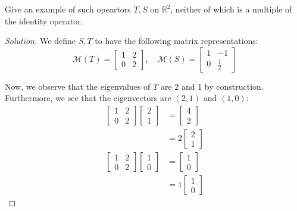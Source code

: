 \documentclass{article}
\newenvironment{solution}{\begin{proof}[Solution]}{\end{proof}}
\newcommand{\RR}{\mathbb{R}}
\begin{document}
	\begin{hw}
		Give an example of such opeartors $T, S$ on $\RR^{2}$, neither of which is a multiple of the identity operator.
	\end{hw}
	\begin{solution}
		We define $S,T$ to have the following matrix representations:
		\begin{equation*}
			\mathcal M(T) = \begin{bmatrix}
				1 & 2 \\ 0 & 2
			\end{bmatrix}, \quad \mathcal{M}(S) = \begin{bmatrix}
			1 & -1 \\ 0 & \frac{1}{2}
		\end{bmatrix}
		\end{equation*}
	
		Now, we observe that the eigenvalues of $T$ are $2$ and $1$ by construction. Furthermore, we see that the eigenvectors are $(2,1)$ and $(1,0)$:
		\begin{align*}
			\begin{bmatrix}
				1 & 2 \\ 0 & 2 
			\end{bmatrix}
			\begin{bmatrix}
				2 \\ 1
			\end{bmatrix} &= \begin{bmatrix}
			4 \\ 2
		\end{bmatrix} \\
	&= 2\begin{bmatrix}
		2 \\ 1
	\end{bmatrix} \\
	\begin{bmatrix}
	1 & 2 \\ 0 & 2 
\end{bmatrix}
\begin{bmatrix}
	1 \\ 0
\end{bmatrix} &= \begin{bmatrix}
	1 \\ 0
\end{bmatrix} \\
&= 1\begin{bmatrix}
	1 \\ 0
\end{bmatrix}
		\end{align*}
	

\end{solution}
\end{document}
